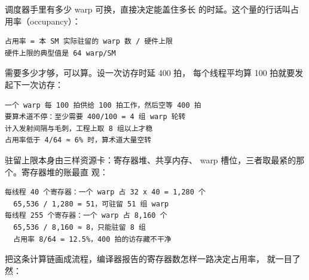 调度器手里有多少 warp 可换，直接决定能盖住多长
的时延。这个量的行话叫占用率（occupancy）：

\begin{lstlisting}
占用率 = 本 SM 实际驻留的 warp 数 / 硬件上限
硬件上限的典型值是 64 warp/SM
\end{lstlisting}

需要多少才够，可以算。设一次访存时延 400 拍，
每个线程平均算 100 拍就要发起下一次访存：

\begin{lstlisting}
一个 warp 每 100 拍供给 100 拍工作，然后空等 400 拍
要算术道不停：至少需要 400/100 = 4 组 warp 轮转
计入发射间隔与毛刺，工程上取 8 组以上才稳
占用率低于 4/64 ≈ 6% 时，算术道大量空转
\end{lstlisting}

驻留上限本身由三样资源卡：寄存器堆、共享内存、
warp 槽位，三者取最紧的那个。寄存器堆的账最直
观：

\begin{lstlisting}
每线程 40 个寄存器：一个 warp 占 32 x 40 = 1,280 个
  65,536 / 1,280 = 51，可驻留 51 组 warp
每线程 255 个寄存器：一个 warp 占 8,160 个
  65,536 / 8,160 ≈ 8，只能驻留 8 组
  占用率 8/64 = 12.5%，400 拍的访存藏不干净
\end{lstlisting}

把这条计算链画成流程，编译器报告的寄存器数怎样一路决定占用率，
就一目了然：

